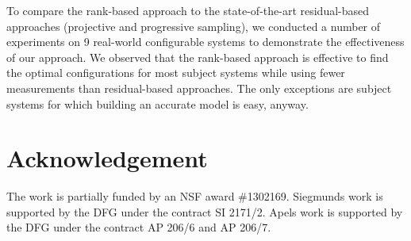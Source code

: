 \documentclass[sigconf]{acmart}
\begin{document}
To compare the rank-based approach to the state-of-the-art residual-based approaches (projective and progressive sampling), we conducted  a number of experiments on 9 real-world configurable systems to demonstrate the effectiveness of our approach. We observed that the rank-based approach is effective to find the optimal configurations for most subject systems while using fewer measurements than residual-based approaches. The only exceptions are subject systems for which building an accurate model is easy, anyway.
 
\section*{Acknowledgement}
The work is partially funded by an NSF award \#1302169. Siegmund\textquotesingle s work is supported by the DFG under the contract SI 2171/2. Apel\textquotesingle s work is supported by the DFG under the contract AP 206/6 and AP 206/7.


%


\balance



 






\end{document}
